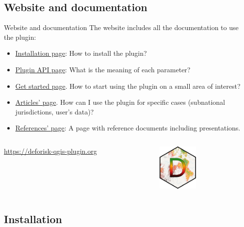 \documentclass[10pt,table,dvipsnames,compress]{beamer}
\begin{document}
\subsection{Website and documentation}
\label{sec:org7f2ce28}

\begin{frame}[label={sec:org6c026ea}]{Website and documentation}
The website includes all the documentation to use the plugin:

\begin{itemize}
\item \href{https://deforisk-qgis-plugin/installation.html}{Installation page}: How to install the plugin?
\item \href{https://deforisk-qgis-plugin/plugin\_api.html}{Plugin API page}: What is the meaning of each parameter?
\item \href{https://deforisk-qgis-plugin/get\_started.html}{Get started page}. How to start using the plugin on a small area of interest?
\item \href{https://deforisk-qgis-plugin/articles.html}{Articles' page}. How can I use the plugin for specific cases (subnational jurisdictions, user's data)?
\item \href{https://deforisk-qgis-plugin.org/articles/references.html}{References' page}: A page with reference documents including presentations.
\end{itemize}

\begin{columns}
\begin{column}{0.5\columnwidth}
\flushright \url{https://deforisk-qgis-plugin.org}
\end{column}
\begin{column}{0.5\columnwidth}
\begin{center}
\includegraphics[width=2cm]{figs/logo-deforisk.png}
\end{center}
\end{column}
\end{columns}
\end{frame}

\subsection{Installation}
\label{sec:orgfff0012}
\end{document}

